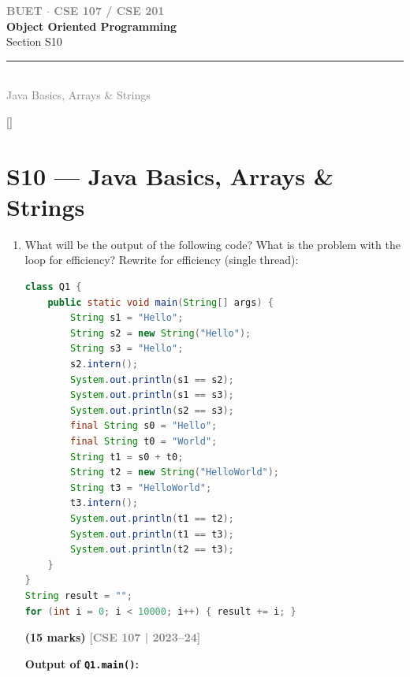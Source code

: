 \documentclass[12pt,a3paper]{article}
\newcommand{\yr}[1]{\hfill\textcolor{gray}{\small\textbf{[#1]}}}
\newcommand{\mk}[1]{\textcolor{orange!70!black}{\small\textbf{(#1 marks)}}}
\newcommand{\secdivider}[4]{%
  \newpage\thispagestyle{empty}%
  \vspace*{\fill}%
  \begin{tcolorbox}[enhanced,colback=#4!7,colframe=#3,boxrule=1.5pt,arc=8pt,
    left=20pt,right=20pt,top=22pt,bottom=22pt,
    shadow={3pt}{-3pt}{0pt}{black!15}]
    \centering
    {\large\textcolor{gray}{\textbf{BUET $\cdot$ CSE 107 / CSE 201}}}\\[8pt]
    {\fontsize{26}{32}\selectfont\bfseries\textcolor{#3}{Object Oriented Programming}}\\[6pt]
    {\fontsize{15}{19}\selectfont\textcolor{dgray}{#1}}\\[12pt]
    \textcolor{#3!60}{\rule{0.5\textwidth}{0.5pt}}\\[6pt]
    {\small\textcolor{gray}{#2}}
  \end{tcolorbox}%
  \vspace*{\fill}\newpage%
}
\begin{document}
\secdivider{Section S10}{Java Basics, Arrays \& Strings}{cB}{cB}
\label{sec:S10}
\titleformat{\section}{\large\bfseries\color{cB}}{}{0em}{}[\titlerule]
\section{S10 --- Java Basics, Arrays \& Strings}

\begin{enumerate}
\item What will be the output of the following code? What is the problem with the loop for efficiency? Rewrite for efficiency (single thread):
\begin{lstlisting}[language=Java]
class Q1 {
    public static void main(String[] args) {
        String s1 = "Hello";
        String s2 = new String("Hello");
        String s3 = "Hello";
        s2.intern();
        System.out.println(s1 == s2);
        System.out.println(s1 == s3);
        System.out.println(s2 == s3);
        final String s0 = "Hello";
        final String t0 = "World";
        String t1 = s0 + t0;
        String t2 = new String("HelloWorld");
        String t3 = "HelloWorld";
        t3.intern();
        System.out.println(t1 == t2);
        System.out.println(t1 == t3);
        System.out.println(t2 == t3);
    }
}
String result = "";
for (int i = 0; i < 10000; i++) { result += i; }
\end{lstlisting}
\mk{15}
\yr{CSE 107 | 2023--24}

\begin{tcolorbox}[enhanced,breakable,ansbox,
  colback=cB!4,colframe=cB,boxrule=0.8pt,arc=5pt,
  title={\textbf{Answer --- \texttt{String} \texttt{==} Comparisons \& Loop Efficiency}},
  fonttitle=\bfseries\color{white},colbacktitle=cB]

\textbf{Output of \texttt{Q1.main()}:}


\end{tcolorbox}
\end{enumerate}
\end{document}
